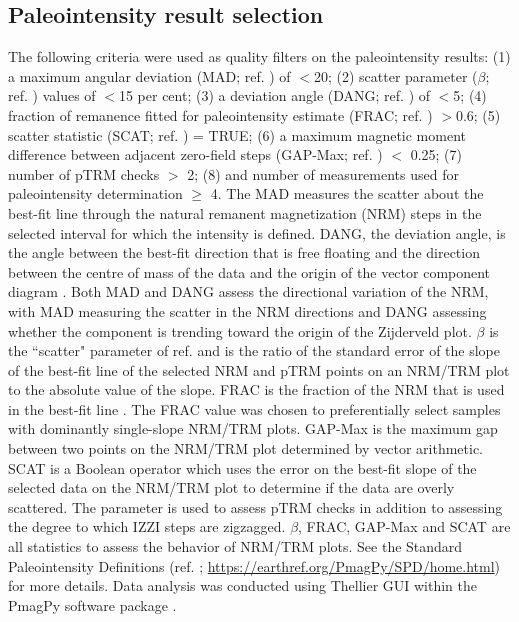\documentclass[9pt,twocolumn,twoside,lineno]{pnas-new}
\begin{document}
{%

\subsection*{Paleointensity result selection}
The following criteria were used as quality filters on the paleointensity results: (1) a maximum angular deviation (MAD; ref. \citealp{Kirschvink1980a}) of $<$20\textdegree; (2) scatter parameter ($\beta$; ref. \citealp{Coe1978a}) values of $<$15 per cent; (3) a deviation angle (DANG; ref. \citealp{Tauxe2004a}) of $<$5\textdegree; (4) fraction of remanence fitted for paleointensity estimate (FRAC; ref. \cite{Shaar2013a}) $>$0.6; (5) scatter statistic (SCAT; ref. \citealp{Shaar2013a}) = TRUE; (6) a maximum magnetic moment difference between adjacent zero-field steps (GAP-Max; ref. \citealp{Shaar2013a}) $<$ 0.25; (7) number of pTRM checks $>$ 2; (8) and number of measurements used for paleointensity determination $\geq$ 4. The MAD measures the scatter about the best-fit line through the natural remanent magnetization (NRM) steps in the selected interval for which the intensity is defined. DANG, the deviation angle, is the angle between the best-fit direction that is free floating and the direction between the centre of mass of the data and the origin of the vector component diagram \cite{Tauxe2004a}. Both MAD and DANG assess the directional variation of the NRM, with MAD measuring the scatter in the NRM directions and DANG assessing whether the component is trending toward the origin of the Zijderveld plot. $\beta$ is the ``scatter" parameter of ref. \cite{Coe1978a} and is the ratio of the standard error of the slope of the best-fit line of the selected NRM and pTRM points on an NRM/TRM plot to the absolute value of the slope. FRAC is the fraction of the NRM that is used in the best-fit line \cite{Shaar2013a}. The FRAC value was chosen to preferentially select samples with dominantly single-slope NRM/TRM plots. GAP-Max is the maximum gap between two points on the NRM/TRM plot determined by vector arithmetic. SCAT is a Boolean operator which uses the error on the best-fit slope of the selected data on the NRM/TRM plot to determine if the data are overly scattered. The parameter is used to assess pTRM checks in addition to assessing the degree to which IZZI steps are zigzagged. $\beta$, FRAC, GAP-Max and SCAT are all statistics to assess the behavior of NRM/TRM plots. See the Standard Paleointensity Definitions (ref. \citealp{Paterson2014a}; \url{https://earthref.org/PmagPy/SPD/home.html}) for more details. Data analysis was conducted using Thellier GUI \cite{Shaar2013a} within the PmagPy software package \cite{Tauxe2016a}.

}
\end{document}

